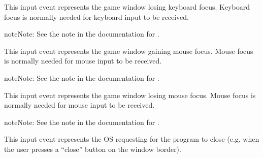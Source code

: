 \documentclass[letterpaper,10pt,english]{sphinxmanual}
\begin{document}

\begin{fulllineitems}
\label{input:sge.input.KeyboardFocusLose}
This input event represents the game window losing keyboard focus.
Keyboard focus is normally needed for keyboard input to be received.

\begin{notice}{note}{Note:}
See the note in the documentation for
{\hyperref[input:sge.input.KeyboardFocusGain]{\emph{}}}.
\end{notice}

\end{fulllineitems}


\begin{fulllineitems}
\label{input:sge.input.MouseFocusGain}
This input event represents the game window gaining mouse focus.
Mouse focus is normally needed for mouse input to be received.

\begin{notice}{note}{Note:}
See the note in the documentation for
{\hyperref[input:sge.input.KeyboardFocusGain]{\emph{}}}.
\end{notice}

\end{fulllineitems}


\begin{fulllineitems}
\label{input:sge.input.MouseFocusLose}
This input event represents the game window losing mouse focus.
Mouse focus is normally needed for mouse input to be received.

\begin{notice}{note}{Note:}
See the note in the documentation for
{\hyperref[input:sge.input.KeyboardFocusGain]{\emph{}}}.
\end{notice}

\end{fulllineitems}


\begin{fulllineitems}
\label{input:sge.input.QuitRequest}
This input event represents the OS requesting for the program to
close (e.g. when the user presses a ``close'' button on the window
border).

\end{fulllineitems}
\end{document}
